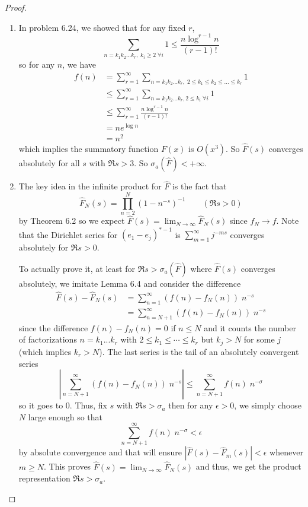 \documentclass[12pt]{article}
\newcommand{\Fhat}{\widehat{F}}
\newcommand{\Abs}[1]{\left| #1 \right|}
\begin{document}
\begin{proof}
\begin{enumerate}
\item In problem 6.24, we showed that for any fixed $r$,
$$\sum_{n = k_1 k_2 ... k_r, \; k_i \geq 2 \; \forall i} 1 \leq \frac{n \log^{r-1} n}{(r-1)!}$$
so for any $n$, we have
\begin{align*}
f(n) &= \sum_{r = 1}^{\infty} \sum_{n = k_1 k_2 ... k_r, \; 2 \leq k_1 \leq k_2 \leq ... \leq k_r} 1\\
&\leq \sum_{r = 1}^{\infty} \sum_{n = k_1 k_2 ... k_r, 2 \leq k_i \; \forall i} 1\\
&\leq \sum_{r = 1}^{\infty} \frac{n \log^{r-1} n}{(r-1)!}\\
&= n e^{\log n}\\
&= n^2
\end{align*}
which implies the summatory function $F(x)$ is $O(x^3)$. So $\Fhat(s)$ converges absolutely for all $s$ with $\Re s > 3$. So $\sigma_a(\Fhat) < +\infty$.

\item The key idea in the infinite product for $\Fhat$ is the fact that
$$\Fhat_N(s) = \prod_{n = 2}^{N} (1 - n^{-s})^{-1} \qquad (\Re s > 0)$$
by Theorem 6.2 so we expect $\Fhat(s) = \lim_{N \rightarrow \infty} \Fhat_N(s)$ since $f_N \rightarrow f$. Note that the Dirichlet series for $(e_1 - e_j)^{*-1}$ is $\sum_{m=1}^{\infty} j^{-m s}$ converges absolutely for $\Re s > 0$.

To actually prove it, at least for $\Re s > \sigma_a(\Fhat)$ where $\Fhat(s)$ converges absolutely, we imitate Lemma 6.4 and consider the difference
\begin{align*}
\Fhat(s) - \Fhat_N(s) &= \sum_{n=1}^{\infty} (f(n) - f_N(n)) \; n^{-s} \\
&= \sum_{n=N + 1}^{\infty} (f(n) - f_N(n)) \; n^{-s}
\end{align*}
since the difference $f(n) - f_N(n) = 0$ if $n \leq N$ and it counts the number of factorizations $n = k_1 ... k_r$ with $2 \leq k_1 \leq \cdots \leq k_r$ but $k_j > N$ for some $j$ (which implies $k_r > N$). The last series is the tail of an absolutely convergent series 
$$\Abs{ \sum_{n=N + 1}^{\infty} (f(n) - f_N(n)) \; n^{-s} } \leq \sum_{n = N + 1}^{\infty} f(n) \; n^{-\sigma}$$
so it goes to 0. Thus, fix $s$ with $\Re s > \sigma_a$ then for any $\epsilon > 0$, we simply choose $N$ large enough so that
$$\sum_{n = N + 1}^{\infty} f(n) \; n^{-\sigma} < \epsilon$$
by absolute convergence and that will ensure $|\Fhat(s) - \Fhat_m(s)| < \epsilon$ whenever $m \geq N$. This proves $\Fhat(s) = \lim_{N \rightarrow \infty} \Fhat_N(s)$ and thus, we get the product representation $\Re s > \sigma_a$.


\end{enumerate}
\end{proof}
\end{document}
